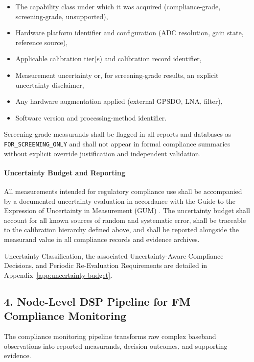 \documentclass[11pt]{report}
\begin{document}
\begin{itemize}
	\item The capability class under which it was acquired (compliance-grade, screening-grade, unsupported),
	\item Hardware platform identifier and configuration (ADC resolution, gain state, reference source),
	\item Applicable calibration tier(s) and calibration record identifier,
	\item Measurement uncertainty or, for screening-grade results, an explicit uncertainty disclaimer,
	\item Any hardware augmentation applied (external GPSDO, LNA, filter),
	\item Software version and processing-method identifier.
\end{itemize}

Screening-grade measurands shall be flagged in all reports and databases as \texttt{FOR\_SCREENING\_ONLY} and shall not appear in formal compliance summaries without explicit override justification and independent validation.

\paragraph*{Uncertainty Budget and Reporting}\;

\noindent 
All measurements intended for regulatory compliance use shall be accompanied by a documented uncertainty evaluation in accordance with the Guide to the Expression of Uncertainty in Measurement (GUM) \cite{JCGM100:2008}. The uncertainty budget shall account for all known sources of random and systematic error, shall be traceable to the calibration hierarchy defined above, and shall be reported alongside the measurand value in all compliance records and evidence archives.

Uncertainty Classification, the associated Uncertainty-Aware Compliance Decisions, and Periodic Re-Evaluation Requirements are detailed in Appendix~\ref{app:uncertainty-budget}.

\subsection*{4. Node-Level DSP Pipeline for FM Compliance Monitoring}\;

\noindent
The compliance monitoring pipeline transforms raw complex baseband observations into reported measurands, decision outcomes, and supporting evidence.
\end{document}
